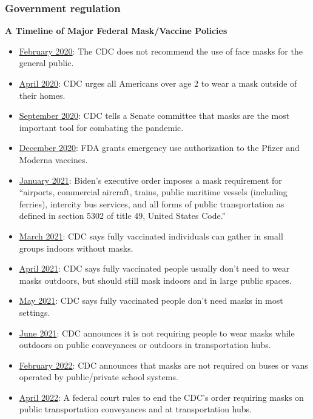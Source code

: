 \documentclass[11pt]{article}
\begin{document}
\subsubsection{Government regulation}

\textbf{A Timeline of Major Federal Mask/Vaccine Policies}
\begin{itemize}
    \item \underline{February 2020}: The CDC does not recommend the use of face masks for the general public.
    
    \item \underline{April 2020}: CDC urges all Americans over age 2 to wear a mask outside of their homes. 
    
    \item \underline{September 2020}: CDC tells a Senate committee that masks are the most important tool for combating the pandemic.

    \item \underline{December 2020}: FDA grants emergency use authorization to the Pfizer and Moderna vaccines.
    
    \item \underline{January 2021}: Biden's executive order imposes a mask requirement for “airports, commercial aircraft, trains, public maritime vessels (including ferries), intercity bus services, and all forms of public transportation as defined in section 5302 of title 49, United States Code.”
    
    \item \underline{March 2021}: CDC says fully vaccinated individuals can gather in small groups indoors without masks.
    
    \item \underline{April 2021}: CDC says fully vaccinated people usually don’t need to wear masks outdoors, but should still mask indoors and in large public spaces.
    
    \item \underline{May 2021}: CDC says fully vaccinated people don’t need masks in most settings.
    
    \item \underline{June 2021}: CDC announces it is not requiring people to wear masks while outdoors on public conveyances or outdoors in transportation hubs.
    
    \item \underline{February 2022}: CDC announces that masks are not required on buses or vans operated by public/private school systems.
    
    \item \underline{April 2022}: A federal court rules to end the CDC’s order requiring masks on public transportation conveyances and at transportation hubs.
\end{itemize}
\end{document}
